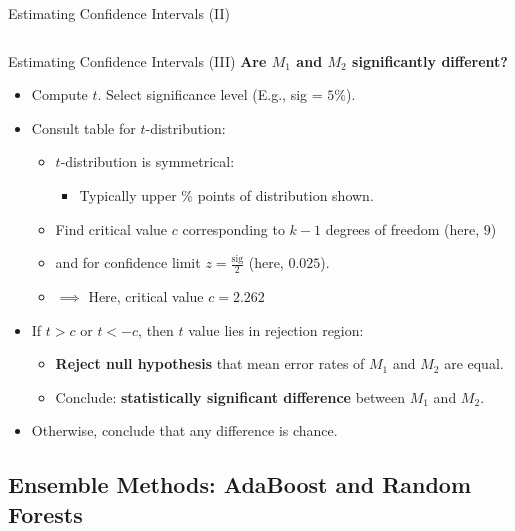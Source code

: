 \begin{frame}{Estimating Confidence Intervals (II)}
\begin{columns}
\begin{column}{0.35\textwidth}
		\end{column}
	\end{columns}


\end{frame}

\begin{frame}{Estimating Confidence Intervals (III)}
	\textbf{Are $M_1$ and $M_2$ {\color{airforceblue} significantly different}?}
	\begin{itemize}
		\item Compute $t$. Select significance level (E.g., sig = $5 \%$).
		\item Consult table for $t$-distribution:
		      \begin{itemize}
			      \item $t$-distribution is symmetrical:
			            \begin{itemize}
				            \item Typically upper $\%$ points of distribution shown.
			            \end{itemize}
			      \item Find critical value $c$ corresponding to $k-1$ degrees of freedom (here, $9$)
			      \item and for confidence limit $z = \frac{\text{sig}}{2}$ (here, $0.025$).
			      \item $\implies$ Here, critical value $c = 2.262$
		      \end{itemize}
		\item If $t > c$ or $t < -c$, then $t$ value lies in rejection region:
		      \begin{itemize}
			      \item \textbf{Reject null hypothesis} that mean error rates of $M_1$ and $M_2$ are equal.
			      \item Conclude: \textbf{statistically significant difference} between $M_1$ and $M_2$.
		      \end{itemize}
		\item Otherwise, conclude that any difference is chance.
	\end{itemize}
\end{frame}

\subsection*{Ensemble Methods: AdaBoost and Random Forests}

